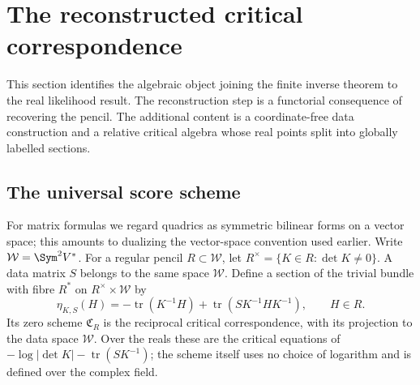 \section{The reconstructed critical correspondence}
\label{sec:critical-correspondence-v143}

This section identifies the algebraic object joining the finite inverse
theorem to the real likelihood result.  The reconstruction step is a
functorial consequence of recovering the pencil.  The additional
content is a coordinate-free data construction and a relative critical
algebra whose real points split into globally labelled sections.

\subsection{The universal score scheme}
For matrix formulas we regard quadrics as symmetric bilinear forms
on a vector space; this amounts to dualizing the vector-space convention
used earlier.  Write \(\mathcal W=\Sym^2V^*\).  For a regular
pencil \(R\subset\mathcal W\), let
\(R^\times=\{K\in R:\det K\ne0\}\).
A data matrix \(S\) belongs to the same space \(\mathcal W\).
Define a section of the trivial bundle with fibre \(R^*\) on
\(R^\times\times\mathcal W\) by
\begin{equation}\label{eq:universal-score-v143}
 \eta_{K,S}(H)=-\operatorname{tr}(K^{-1}H)
       +\operatorname{tr}(S K^{-1}H K^{-1}),\qquad H\in R.
\end{equation}
Its zero scheme \(\mathfrak C_R\) is the reciprocal critical
correspondence, with its projection to the data space \(\mathcal W\).
Over the reals these are the critical equations of
\(-\log|\det K|-\operatorname{tr}(SK^{-1})\); the scheme itself
uses no choice of logarithm and is defined over the complex field.


